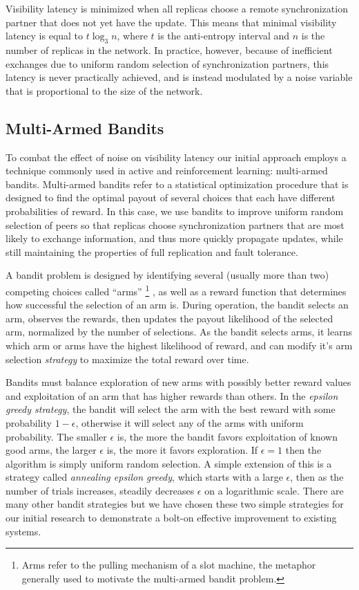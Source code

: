Visibility latency is minimized when all replicas choose a remote
synchronization partner that does not yet have the update.
This means that minimal visibility latency is equal to $t\log_3n$, where
$t$ is the anti-entropy interval and $n$ is the number of replicas in the
network.
In practice, however, because of inefficient exchanges due to uniform random
selection of synchronization partners, this latency is never practically
achieved, and is instead modulated by a noise variable that is
proportional to the size of the network.

\subsection{Multi-Armed Bandits}
\label{ch06_multi_armed_bandits}

To combat the effect of noise on visibility latency our initial approach
employs a technique commonly used in active and reinforcement learning:
multi-armed bandits.
Multi-armed bandits refer to a statistical optimization procedure that is
designed to find the optimal payout of several choices that each have
different probabilities of reward.
In this case, we use bandits to improve uniform random selection of peers so
that replicas choose synchronization partners that are most likely to exchange
information, and thus more quickly propagate updates, while still maintaining
the properties of full replication and fault tolerance.

A bandit problem is designed by identifying several (usually more than two)
competing choices called ``arms''\renewcommand{\baselinestretch}{1} \small\footnotesize\footnote{Arms refer to the pulling
mechanism of a slot machine, the metaphor generally used to motivate the
multi-armed bandit problem.}\renewcommand{\baselinestretch}{2} \small\normalsize, as well as a reward function that determines how
successful the selection of an arm is.
During operation, the bandit selects an arm, observes the rewards, then
updates the payout likelihood of the selected arm, normalized by the number
of selections.
As the bandit selects arms, it learns which arm or arms have the highest
likelihood of reward, and can modify it's arm selection \emph{strategy} to
maximize the total reward over time.

Bandits must balance exploration of new arms with possibly better reward
values and exploitation of an arm that has higher rewards than others.
In the \emph{epsilon greedy strategy}, the bandit will select the arm with
the best reward with some probability $1-\epsilon$, otherwise it will select
any of the arms with uniform probability.
The smaller $\epsilon$ is, the more the bandit favors exploitation of known
good arms, the larger $\epsilon$ is, the more it favors exploration.
If $\epsilon=1$ then the algorithm is simply uniform random selection.
A simple extension of this is a strategy called \emph{annealing epsilon
greedy}, which starts with a large $\epsilon$, then as the number of trials
increases, steadily decreases $\epsilon$ on a logarithmic scale.
There are many other bandit strategies but we have chosen these two simple
strategies for our initial research to demonstrate a bolt-on effective
improvement to existing systems.

